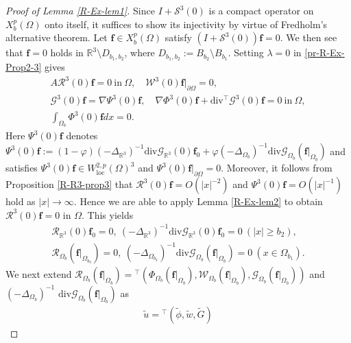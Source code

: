 \documentclass[dvipdfmx,12pt]{article}
\begin{document}
\begin{proof}[Proof of Lemma \ref{R-Ex-lem1}]
Since $I+\mathcal{S}^3(0)$ is a compact operator on $X_b^p(\Omega)$ onto itself, it suffices to show its injectivity by virtue of Fredholm's alternative theorem. Let $\mathbf{f}\in X_b^p(\Omega)$ satisfy $(I+\mathcal{S}^3(0))\mathbf{f}=0$. We then see that $\mathbf{f}=0$ holds in $\mathbb{R}^3\setminus D_{b_1,b_2}$, where $D_{b_1,b_2}:=B_{b_2}\setminus B_{b_1}$.
Setting $\lambda=0$ in \eqref{pr-R-Ex-Prop2-3} gives
\begin{gather*}
A\mathcal{R}^3(0)\mathbf{f}=0~\mathrm{in}~\Omega, \quad \mathcal{W}^3(0)\mathbf{f}|_{\partial \Omega}=0, \\
 \mathcal{G}^{3}(0)\mathbf{f}=\nabla\Psi^3(0)\mathbf{f},\quad
\nabla \Phi^3(0)\mathbf{f}+\mathrm{div} {}^\top \mathcal{G}^3(0)\mathbf{f}=0~\mathrm{in}~\Omega, \\
\int_{\Omega_{b}} \Phi^{3}(0)\mathbf{f}dx=0. 
\end{gather*}
Here $\Psi^3(0)\mathbf{f}$ denotes 
$
\Psi^3(0)\mathbf{f}:=(1-\varphi)(-\Delta_{\mathbb{R}^3} )^{-1}\mathrm{div}\mathcal{G}_{\mathbb{R}^3}(0)\mathbf{f}_0+\varphi(-\Delta_{\Omega_{b}})^{-1}\mathrm{div}\mathcal{G}_{\Omega_{b}}(\mathbf{f}|_{\Omega_{b}})
$
and satisfies $\Psi^3(0)\mathbf{f}\in W_{\mathrm{loc}}^{2,p}(\Omega)^3$ and $\Psi^3(0)\mathbf{f}|_{\partial \Omega}=0$. Moreover, it follows from Proposition \ref{R-R3-prop3} that $\mathcal{R}^3(0)\mathbf{f}=O(|x|^{-2})$ and $\Psi^3(0)\mathbf{f}=O(|x|^{-1})$ hold as $|x|\to\infty$. Hence we are able to apply Lemma \ref{R-Ex-lem2} to obtain $\mathcal{R}^3(0)\mathbf{f}=0$ in $\Omega$. This yields
\begin{align}
\mathcal{R}_{\mathbb{R}^3}(0)\mathbf{f}_0=0,~(-\Delta_{\mathbb{R}^3} )^{-1}\mathrm{div}\mathcal{G}_{\mathbb{R}^3}(0)\mathbf{f}_0=0~(|x|\ge b_2),  \label{pr-R-Ex-lem1-1} \\ 
\mathcal{R}_{\Omega_{b}}(\mathbf{f}|_{\Omega_{b_3}})=0,~(-\Delta_{\Omega_{b_3}})^{-1}\mathrm{div}\mathcal{G}_{\Omega_{b}}(\mathbf{f}|_{\Omega_{b}})=0~(x\in \Omega_{b_1}). \label{pr-R-Ex-lem1-2}
\end{align}
We next extend $\mathcal{R}_{\Omega_{b}}(\mathbf{f}|_{\Omega_{b}})={}^\top(\Phi_{\Omega_{b}}(\mathbf{f}|_{\Omega_{b}}),\mathcal{W}_{\Omega_{b}}(\mathbf{f}|_{\Omega_{b}}),\mathcal{G}_{\Omega_{b}}(\mathbf{f}|_{\Omega_{b}}))$ and $(-\Delta_{\Omega_{b}})^{-1}$ $\mathrm{div}\mathcal{G}_{\Omega_{b}}(\mathbf{f}|_{\Omega_{b}})$ as
\begin{gather*}
\widetilde{u}={}^\top (\widetilde{\phi},\widetilde{w},\widetilde{G})

\end{gather*}
\end{proof}
\end{document}
